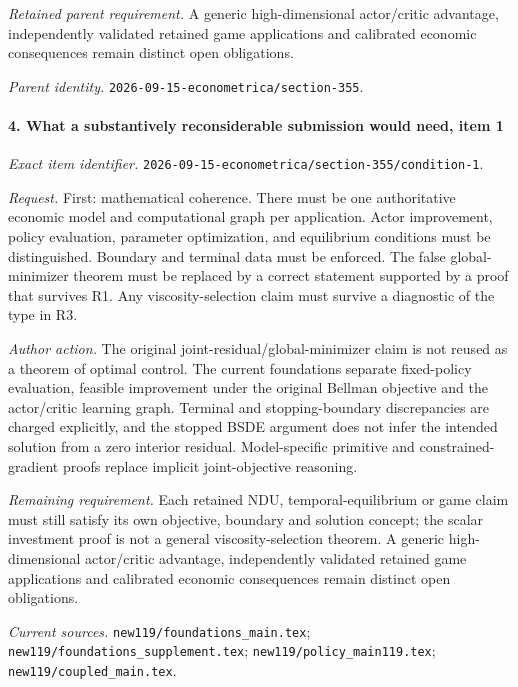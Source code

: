 \par\emph{Retained parent requirement.} A generic high-dimensional actor/\allowbreak{}critic advantage, independently validated retained game applications and calibrated economic consequences remain distinct open obligations.

\par\emph{Parent identity.} \nolinkurl{2026-09-15-econometrica/section-355}.

\paragraph{4. What a substantively reconsiderable submission would need, item 1}

\emph{Exact item identifier.} \nolinkurl{2026-09-15-econometrica/section-355/condition-1}.

\par\emph{Request.} First: mathematical coherence. There must be one authoritative economic model and computational graph per application. Actor improvement, policy evaluation, parameter optimization, and equilibrium conditions must be distinguished. Boundary and terminal data must be enforced. The false global-minimizer theorem must be replaced by a correct statement supported by a proof that survives R1. Any viscosity-selection claim must survive a diagnostic of the type in R3.

\par\emph{Author action.} The original joint-residual/\allowbreak{}global-minimizer claim is not reused as a theorem of optimal control. The current foundations separate fixed-policy evaluation, feasible improvement under the original Bellman objective and the actor/\allowbreak{}critic learning graph. Terminal and stopping-boundary discrepancies are charged explicitly, and the stopped BSDE argument does not infer the intended solution from a zero interior residual. Model-specific primitive and constrained-gradient proofs replace implicit joint-objective reasoning.

\par\emph{Remaining requirement.} Each retained NDU, temporal-equilibrium or game claim must still satisfy its own objective, boundary and solution concept; the scalar investment proof is not a general viscosity-selection theorem. A generic high-dimensional actor/\allowbreak{}critic advantage, independently validated retained game applications and calibrated economic consequences remain distinct open obligations.

\par\emph{Current sources.} \nolinkurl{new119/foundations_main.tex}; \nolinkurl{new119/foundations_supplement.tex}; \nolinkurl{new119/policy_main119.tex}; \nolinkurl{new119/coupled_main.tex}.

